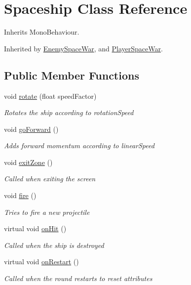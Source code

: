 \hypertarget{class_spaceship}{\section{Spaceship Class Reference}
\label{class_spaceship}
}


Inherits Mono\-Behaviour.



Inherited by \hyperlink{class_enemy_space_war}{Enemy\-Space\-War}, and \hyperlink{class_player_space_war}{Player\-Space\-War}.

\subsection*{Public Member Functions}
\begin{DoxyCompactItemize}
\item 
void \hyperlink{class_spaceship_a4e3a2e25845bc231d3a044838a53b6bc}{rotate} (float speed\-Factor)
\begin{DoxyCompactList}\small\item\em Rotates the ship according to rotation\-Speed \end{DoxyCompactList}\item 
void \hyperlink{class_spaceship_abfcf9a39a1e43f873495100e9bb3c6fe}{go\-Forward} ()
\begin{DoxyCompactList}\small\item\em Adds forward momentum according to linear\-Speed \end{DoxyCompactList}\item 
void \hyperlink{class_spaceship_a0cf6944029fc2dc9bf58c19e3dc5d488}{exit\-Zone} ()
\begin{DoxyCompactList}\small\item\em Called when exiting the screen \end{DoxyCompactList}\item 
void \hyperlink{class_spaceship_a00d89258e92c05f994e45dd18711cfb9}{fire} ()
\begin{DoxyCompactList}\small\item\em Tries to fire a new projectile \end{DoxyCompactList}\item 
virtual void \hyperlink{class_spaceship_a5b6f4b560e58b817007ec58c1378f653}{on\-Hit} ()
\begin{DoxyCompactList}\small\item\em Called when the ship is destroyed \end{DoxyCompactList}\item 
virtual void \hyperlink{class_spaceship_af4c57554f662d9843c815272dffd3625}{on\-Restart} ()
\begin{DoxyCompactList}\small\item\em Called when the round restarts to reset attributes \end{DoxyCompactList}\end{DoxyCompactItemize}

